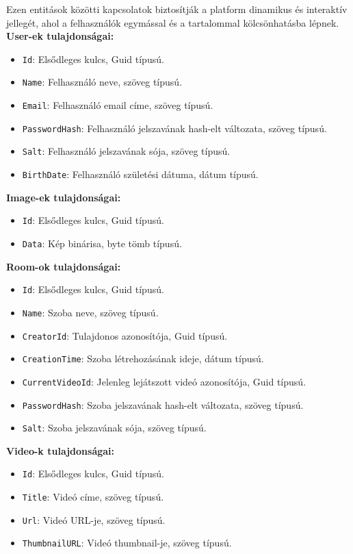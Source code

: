 Ezen entitások közötti kapcsolatok biztosítják a platform dinamikus és interaktív jellegét, ahol a felhasználók egymással és a tartalommal kölcsönhatásba lépnek.
\vspace{7em}
\\
\textbf{User-ek tulajdonságai:}
\begin{itemize}
    \item \texttt{Id}: Elsődleges kulcs, Guid típusú.
    \item \texttt{Name}: Felhasználó neve, szöveg típusú.
    \item \texttt{Email}: Felhasználó email címe, szöveg típusú.
    \item \texttt{PasswordHash}: Felhasználó jelszavának hash-elt változata, szöveg típusú.
    \item \texttt{Salt}: Felhasználó jelszavának sója, szöveg típusú.
    \item \texttt{BirthDate}: Felhasználó születési dátuma, dátum típusú.
\end{itemize}
\textbf{Image-ek tulajdonságai:}
\begin{itemize}
    \item \texttt{Id}: Elsődleges kulcs, Guid típusú.
    \item \texttt{Data}: Kép binárisa, byte tömb típusú.
\end{itemize}
\textbf{Room-ok tulajdonságai:}
\begin{itemize}
    \item \texttt{Id}: Elsődleges kulcs, Guid típusú.
    \item \texttt{Name}: Szoba neve, szöveg típusú.
    \item \texttt{CreatorId}: Tulajdonos azonosítója, Guid típusú.
    \item \texttt{CreationTime}: Szoba létrehozásának ideje, dátum típusú.
    \item \texttt{CurrentVideoId}: Jelenleg lejátszott videó azonosítója, Guid típusú.
    \item \texttt{PasswordHash}: Szoba jelszavának hash-elt változata, szöveg típusú.
    \item \texttt{Salt}: Szoba jelszavának sója, szöveg típusú.
\end{itemize}
\textbf{Video-k tulajdonságai:}
\begin{itemize}
    \item \texttt{Id}: Elsődleges kulcs, Guid típusú.
    \item \texttt{Title}: Videó címe, szöveg típusú.
    \item \texttt{Url}: Videó URL-je, szöveg típusú.
    \item \texttt{ThumbnailURL}: Videó thumbnail-je, szöveg típusú.
\end{itemize}

